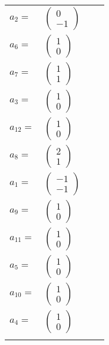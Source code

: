 \documentclass[1p]{elsarticle_modified}
\theoremstyle{definition}
\begin{document}
\begin{tabular}{m{7pt} m{180pt} m{7pt} m{180pt} }
\flushright $a_{2}=$&$\begin{pmatrix}0\\-1\end{pmatrix}$ \\
\flushright $a_{6}=$&$\begin{pmatrix}1\\0\end{pmatrix}$ \\
\flushright $a_{7}=$&$\begin{pmatrix}1\\1\end{pmatrix}$ \\
\flushright $a_{3}=$&$\begin{pmatrix}1\\0\end{pmatrix}$ \\
\flushright $a_{12}=$&$\begin{pmatrix}1\\0\end{pmatrix}$ \\
\flushright $a_{8}=$&$\begin{pmatrix}2\\1\end{pmatrix}$ \\
\flushright $a_{1}=$&$\begin{pmatrix}-1\\-1\end{pmatrix}$ \\
\flushright $a_{9}=$&$\begin{pmatrix}1\\0\end{pmatrix}$ \\
\flushright $a_{11}=$&$\begin{pmatrix}1\\0\end{pmatrix}$ \\
\flushright $a_{5}=$&$\begin{pmatrix}1\\0\end{pmatrix}$ \\
\flushright $a_{10}=$&$\begin{pmatrix}1\\0\end{pmatrix}$ \\
\flushright $a_{4}=$&$\begin{pmatrix}1\\0\end{pmatrix}$\\&\end{tabular}
\end{document}
